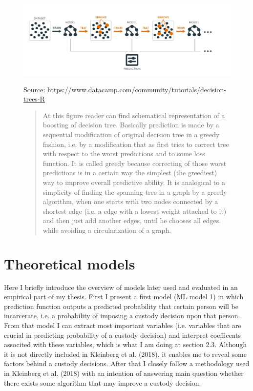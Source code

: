 \documentclass[12pt, twoside,openany]{book} %
\begin{document}
\begin{figure}[H]
\includegraphics[width=\textwidth]{boosting_scheme.jpg}
{\small Source: \url{https://www.datacamp.com/community/tutorials/decision-trees-R} \newline
 \begin{quotation}
At this figure reader can find schematical representation of a boosting of decision tree. Basically prediction is made by a sequential modification of original decision tree in a greedy fashion, i.e. by a modification that as first tries to correct tree with respect to the worst predictions and to some loss function. It is called greedy because correcting of those worst predictions is in a certain way the simplest (the greediest) way to improve overall predictive ability. It is analogical to a simplicity of finding the spanning tree in a graph by a greedy algorithm, when one starts with two nodes connected by a shortest edge (i.e. a edge with a lowest weight attached to it) and then just add another edges, until he chooses all edges, while avoiding a circularization of a graph.
\end{quotation}
 }
\end{figure}


\newpage
\section{Theoretical models}    %
Here I briefly introduce the overview of models later used and evaluated in an empirical part of my thesis. First I present a first model (ML model 1) in which prediction function outputs a predicted probability that certain person will be incarcerate, i.e. a probability of imposing a custody decision upon that person. From that model I can extract most important variables (i.e. variables that are crucial in predicting probability of a custody decision) and interpret coefficents associted with these variables, which is what I am doing at section 2.3. Although it is not directly included in Kleinberg et al. (2018), it enables me to reveal some factors behind a custody decisions. After that I closely follow a methodology used in Kleinberg et al. (2018) with an intention of answering main question whether there exists some algorithm that may improve a custody decision.
\end{document}
